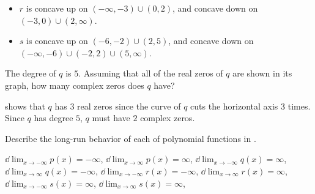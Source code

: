 \begin{exercises}
\begin{problem}
\begin{subproblem}
\begin{shortsolution}
\begin{itemize}
 				\item $r$ is concave up on $(-\infty,-3)\cup (0,2)$, and concave down on $(-3,0)\cup (2,\infty)$.
 				\item $s$ is concave up on $(-6,-2)\cup (2,5)$, and concave down on $(-\infty,-6)\cup (-2,2)\cup (5,\infty)$.
 			\end{itemize}
 		\end{shortsolution}
 	\end{subproblem}
 	\begin{subproblem}
 		The degree of $q$ is $5$. Assuming that all of the real zeros of $q$ are
 		shown in its graph, how many complex zeros does $q$ have?
 		\begin{shortsolution}
 			 shows that $q$ has $3$ real zeros
 			since the curve of $q$ cuts the horizontal axis $3$ times.
 			Since $q$ has degree $5$, $q$ must have $2$ complex zeros.
 		\end{shortsolution}
 	\end{subproblem}
 	\end{problem}
 	 	 	
 	\begin{problem}
 	Describe the long-run behavior of each of polynomial functions in
 	.
 	\begin{shortsolution}
 		$\dd\lim_{x\rightarrow-\infty}p(x)=-\infty$,
 		$\dd\lim_{x\rightarrow\infty}p(x)=\infty$,
 		$\dd\lim_{x\rightarrow-\infty}q(x)=\infty$,
 		$\dd\lim_{x\rightarrow\infty}q(x)=-\infty$,
 		$\dd\lim_{x\rightarrow-\infty}r(x)=-\infty$,
 		$\dd\lim_{x\rightarrow\infty}r(x)=\infty$,
 		$\dd\lim_{x\rightarrow-\infty}s(x)=\infty$,
 		$\dd\lim_{x\rightarrow\infty}s(x)=\infty$,
 	\end{shortsolution}
 	\end{problem}
 	 	 	

\end{exercises}
